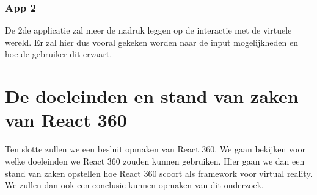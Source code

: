 \subsubsection{App 2}
De 2de applicatie zal meer de nadruk leggen op de interactie met de virtuele wereld. Er zal hier dus vooral gekeken worden naar de input mogelijkheden en hoe de gebruiker dit ervaart.


\section{De doeleinden en stand van zaken van React 360}
\label{sec:doeleinden-reactvr}
Ten slotte zullen we een besluit opmaken van React 360. We gaan bekijken voor welke doeleinden we React 360 zouden kunnen gebruiken. Hier gaan we dan een stand van zaken opstellen hoe React 360 scoort als framework voor virtual reality. We zullen dan ook een conclusie kunnen opmaken van dit onderzoek.



